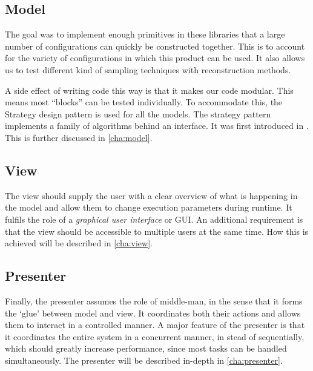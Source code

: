 \documentclass[a4paper, openany, oneside]{memoir}
\begin{document}
\subsection{Model}
\label{sub:model}
The goal was to implement enough primitives in these libraries that a large number of configurations can quickly be constructed together. This is to account for the variety of configurations in which this product can be used. It also allows us to test different kind of sampling techniques with reconstruction methods.

A side effect of writing code this way is that it makes our code modular. This means most ``blocks'' can be tested individually. To accommodate this, the Strategy design pattern is used for all the models. The strategy pattern implements a family of algorithms behind an interface. It was first introduced in \cite{designpatterns}. This is further discussed in \cref{cha:model}.

\subsection{View}
\label{sub:view}
The view should supply the user with a clear overview of what is happening in the model and allow them to change execution parameters during runtime. It fulfils the role of a \emph{graphical user interface} or GUI. An additional requirement is that the view should be accessible to multiple users at the same time. How this is achieved will be described in \cref{cha:view}.

\subsection{Presenter}
\label{sub:presenter}
Finally, the presenter assumes the role of middle-man, in the sense that it forms the `glue' between model and view. It coordinates both their actions and allows them to interact in a controlled manner. A major feature of the presenter is that it coordinates the entire system in a concurrent manner, in stead of sequentially, which should greatly increase performance, since most tasks can be handled simultaneously. The presenter will be described in-depth in \cref{cha:presenter}.
\end{document}
